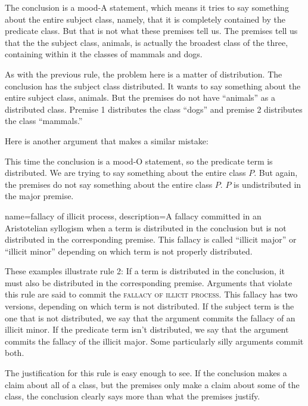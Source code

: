 The conclusion is a mood-A statement, which means it tries to say something about the entire subject class, namely, that it is completely contained by the predicate class. But that is not what these premises tell us. The premises tell us that the the subject class, animals, is actually the broadest class of the three, containing within it the classes of mammals and dogs.

As with the previous rule, the problem here is a matter of distribution. The conclusion has the subject class distributed. It wants to say something about the entire subject class, animals. But the premises do not have ``animals'' as a distributed class. Premise 1 distributes the class ``dogs'' and premise 2 distributes the class ``mammals.''

Here is another argument that makes a similar mistake:

\begin{kormanize}
\end{kormanize}

This time the conclusion is a mood-O statement, so the predicate term is distributed. We are trying to say something about the entire class $P$. But again, the premises do not say something about the entire class $P$. $P$ is undistributed in the major premise.

{
name=fallacy of illicit process,
description={A fallacy committed in an Aristotelian syllogism when a term is distributed in the conclusion but is not distributed in the corresponding premise. This fallacy is called ``illicit major'' or ``illicit minor'' depending on which term is not properly distributed. }
}


These examples illustrate rule 2: If a term is distributed in the conclusion, it must also be distributed in the corresponding premise. Arguments that violate this rule are said to commit the \textsc{\gls{fallacy of illicit process}}. \label{def:illicit_process} This fallacy has two versions, depending on which term is not distributed. If the subject term is the one that is not distributed, we say that the argument commits the fallacy of an illicit minor. If the predicate term isn't distributed, we say that the argument commits the fallacy of the illicit major. Some particularly silly arguments commit both.

The justification for this rule is easy enough to see. If the conclusion makes a claim about all of a class, but the premises only make a claim about some of the class, the conclusion clearly says more than what the premises justify.

